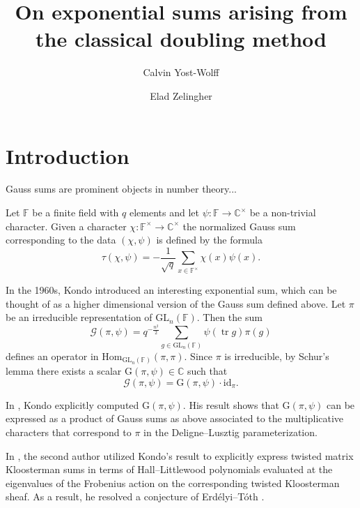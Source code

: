 \documentclass[12pt, reqno]{amsart}
\title[Doubling method exponential sums]{On exponential sums arising from the classical doubling method}
\author{Calvin Yost-Wolff}
\author{Elad Zelingher}
\theoremstyle{definition}
\theoremstyle{definition}
\theoremstyle{definition}
\newcommand{\cComplex}{\mathbb{C}}
\newcommand{\multiplicativegroup}[1]{#1^{\times}}
\newcommand{\Hom}{\mathrm{Hom}}
\newcommand{\idmap}{\mathrm{id}}
\newcommand{\Erdelyi}{Erd{\'e}lyi}
\newcommand{\Toth}{T{\'o}th}
\newcommand{\fieldCharacter}{\psi}
\newcommand{\trace}{\operatorname{tr}}
\newcommand{\GL}{\mathrm{GL}}
\newcommand{\finiteField}{\mathbb{F}}
\newcommand{\GaussSum}[2]{\mathcal{G}\left(#1, #2\right)}
\newcommand{\GaussSumScalar}[2]{\mathrm{G}\left(#1, #2\right)}
\begin{document}
\begin{abstract}
\end{abstract}
\maketitle

\tableofcontents

\section{Introduction}

Gauss sums are prominent objects in number theory...

Let $\finiteField$ be a finite field with $q$ elements and let $\fieldCharacter \colon \finiteField \to \multiplicativegroup{\cComplex}$ be a non-trivial character. Given a character $\chi \colon \multiplicativegroup{\finiteField} \to \multiplicativegroup{\cComplex}$ the normalized Gauss sum corresponding to the data $\left(\chi, \fieldCharacter\right)$ is defined by the formula
$$\tau\left(\chi, \fieldCharacter\right) = -\frac{1}{\sqrt{q}}\sum_{x \in \multiplicativegroup{\finiteField}} \chi\left(x\right) \fieldCharacter\left(x\right).$$

In the 1960s, Kondo \cite{Kondo1963} introduced an interesting exponential sum, which can be thought of as a higher dimensional version of the Gauss sum defined above. Let $\pi$ be an irreducible representation of $\GL_n\left(\finiteField\right)$. Then the sum $$\GaussSum{\pi}{\fieldCharacter} = q^{-\frac{n^2}{2}} \sum_{g \in \GL_n\left(\finiteField\right)} \fieldCharacter\left(\trace g\right) \pi\left(g\right)$$
defines an operator in $\Hom_{\GL_n\left(\finiteField\right)}\left(\pi, \pi\right)$. Since $\pi$ is irreducible, by Schur's lemma there exists a scalar $\GaussSumScalar{\pi}{\fieldCharacter} \in \cComplex$ such that $$\GaussSum{\pi}{\fieldCharacter} = \GaussSumScalar{\pi}{\fieldCharacter} \cdot \idmap_{\pi}.$$

In \cite{Kondo1963}, Kondo explicitly computed $\GaussSumScalar{\pi}{\fieldCharacter}$. His result shows that $\GaussSumScalar{\pi}{\fieldCharacter}$ can be expressed as a product of Gauss sums as above associated to the multiplicative characters that correspond to $\pi$ in the Deligne--Lusztig parameterization.

In \cite{Zelingher2024}, the second author utilized Kondo's result to explicitly express twisted matrix Kloosterman sums in terms of Hall--Littlewood polynomials evaluated at the eigenvalues of the Frobenius action on the corresponding twisted Kloosterman sheaf. As a result, he resolved a conjecture of \Erdelyi{}--\Toth{} \cite{ErdelyiToth2024}.
\end{document}
